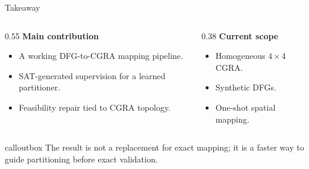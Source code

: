 \documentclass[aspectratio=169,10pt]{beamer}
\newcommand{\smallcaps}[1]{{\footnotesize\bfseries\color{muted}#1}}
\newcommand{\callout}[1]{%
  \begin{beamercolorbox}[rounded=true,wd=\linewidth,sep=0.8ex]{calloutbox}
  #1
  \end{beamercolorbox}}
\begin{document}
\begin{frame}{Takeaway}
  \begin{columns}[T,totalwidth=\linewidth]
    \begin{column}{0.55\linewidth}
      \smallcaps{Main contribution}
      \vspace{0.25cm}
      \begin{itemize}
        \item A working DFG-to-CGRA mapping pipeline.
        \item SAT-generated supervision for a learned partitioner.
        \item Feasibility repair tied to CGRA topology.
      \end{itemize}
    \end{column}
    \begin{column}{0.38\linewidth}
      \smallcaps{Current scope}
      \vspace{0.25cm}
      \begin{itemize}
        \item Homogeneous $4\times4$ CGRA.
        \item Synthetic DFGs.
        \item One-shot spatial mapping.
      \end{itemize}
    \end{column}
  \end{columns}

  \vspace{0.65cm}
  \callout{The result is not a replacement for exact mapping; it is a faster way to guide partitioning before exact validation.}

\end{frame}
\end{document}
